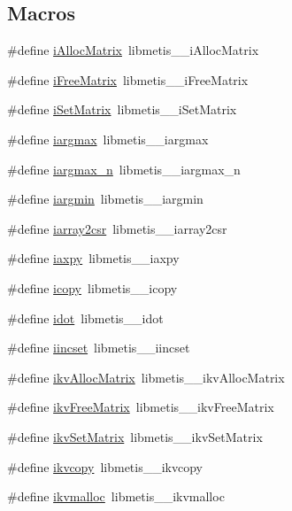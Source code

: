 \subsection*{Macros}
\begin{DoxyCompactItemize}
\item 
\#define \hyperlink{a00212_a9b75eb56fcf340bc98fe86b88acb960d}{i\+Alloc\+Matrix}~libmetis\+\_\+\+\_\+i\+Alloc\+Matrix
\item 
\#define \hyperlink{a00212_aa804bc2325692a7e33119f6ef9df7c5d}{i\+Free\+Matrix}~libmetis\+\_\+\+\_\+i\+Free\+Matrix
\item 
\#define \hyperlink{a00212_a3e893e105104614fb9fba1c6664284dd}{i\+Set\+Matrix}~libmetis\+\_\+\+\_\+i\+Set\+Matrix
\item 
\#define \hyperlink{a00212_a427fafa41661a48e3eab0e3eade9423f}{iargmax}~libmetis\+\_\+\+\_\+iargmax
\item 
\#define \hyperlink{a00212_a3b84ed0cdeb805110cacfd050af288eb}{iargmax\+\_\+n}~libmetis\+\_\+\+\_\+iargmax\+\_\+n
\item 
\#define \hyperlink{a00212_ac674293b6a3948f2356a7d4f09d1872a}{iargmin}~libmetis\+\_\+\+\_\+iargmin
\item 
\#define \hyperlink{a00212_a11fcc2d62fb3be01b27398896c6d6e3f}{iarray2csr}~libmetis\+\_\+\+\_\+iarray2csr
\item 
\#define \hyperlink{a00212_a2d70c92cfb6686899baa0ed630de7bb8}{iaxpy}~libmetis\+\_\+\+\_\+iaxpy
\item 
\#define \hyperlink{a00212_ac2457557d00010febd3d9a4561b274f5}{icopy}~libmetis\+\_\+\+\_\+icopy
\item 
\#define \hyperlink{a00212_a250dde471be7f7dc57fcf011d287e8d3}{idot}~libmetis\+\_\+\+\_\+idot
\item 
\#define \hyperlink{a00212_ad3c1995e380c3cd86ebd6df1476b8612}{iincset}~libmetis\+\_\+\+\_\+iincset
\item 
\#define \hyperlink{a00212_a34dfba47e36dc3013b4c12591de62361}{ikv\+Alloc\+Matrix}~libmetis\+\_\+\+\_\+ikv\+Alloc\+Matrix
\item 
\#define \hyperlink{a00212_ae3e4a814cb7ac24fdacbfe05aa594b70}{ikv\+Free\+Matrix}~libmetis\+\_\+\+\_\+ikv\+Free\+Matrix
\item 
\#define \hyperlink{a00212_ac1eee749ce3560c799774b7bfc233205}{ikv\+Set\+Matrix}~libmetis\+\_\+\+\_\+ikv\+Set\+Matrix
\item 
\#define \hyperlink{a00212_ab59df78d358a2224e3bd6ba0b1d47578}{ikvcopy}~libmetis\+\_\+\+\_\+ikvcopy
\item 
\#define \hyperlink{a00212_ac009f65845201d70bf164c01c655f087}{ikvmalloc}~libmetis\+\_\+\+\_\+ikvmalloc

\end{DoxyCompactItemize}
